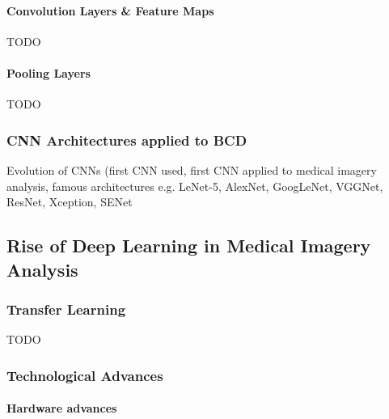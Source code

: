 \paragraph{Convolution Layers \& Feature Maps}

TODO

\paragraph{Pooling Layers}

TODO

\subsubsection{CNN Architectures applied to BCD}

Evolution of CNNs (first CNN used, first CNN applied to medical imagery analysis, famous architectures e.g. LeNet-5, AlexNet, GoogLeNet, VGGNet, ResNet, Xception, SENet



\subsection{Rise of Deep Learning in Medical Imagery Analysis}

\subsubsection{Transfer Learning}

TODO

\subsubsection{Technological Advances}

\paragraph{Hardware advances}

